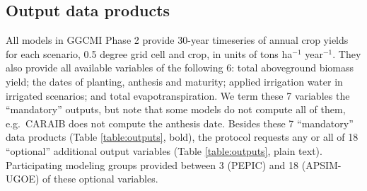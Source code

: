 \documentclass[gmd, manuscript]{copernicus} %
\begin{document}
\subsection{Output data products}
All models in GGCMI Phase 2 provide 30-year timeseries of annual crop yields 
for each scenario, 0.5 degree grid cell and crop, in units of tons ha$^{-1}$ year$^{-1}$. They also provide all available variables of the following 6: total aboveground biomass yield; the dates of planting, anthesis and maturity; applied irrigation water in irrigated scenarios; and total evapotranspiration. 
We term these 7 variables the ``mandatory'' outputs, but note that some models do not compute all of them, e.g.\ CARAIB does not compute the anthesis date.
Besides these 7 ``mandatory'' data products (Table \ref{table:outputs}, bold), the protocol requests any or all of 18 ``optional'' additional output variables (Table \ref{table:outputs}, plain text).
Participating modeling groups provided between 3 (PEPIC) and 18 (APSIM-UGOE) of these optional variables. 
\end{document}
